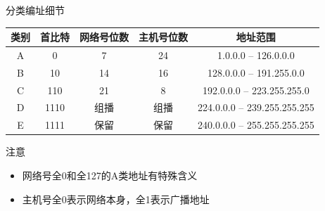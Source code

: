 \documentclass[10pt, aspectratio=169]{beamer}
\begin{document}
\begin{frame}{分类编址细节}
    \begin{table}
        \centering
        \begin{tabular}{|c|c|c|c|c|}
            \hline
            \textbf{类别} & \textbf{首比特} & \textbf{网络号位数} & \textbf{主机号位数} & \textbf{地址范围} \\
            \hline
            A & 0 & 7 & 24 & 1.0.0.0 -- 126.0.0.0 \\
            B & 10 & 14 & 16 & 128.0.0.0 -- 191.255.0.0 \\
            C & 110 & 21 & 8 & 192.0.0.0 -- 223.255.255.0 \\
            D & 1110 & 组播 & 组播 & 224.0.0.0 -- 239.255.255.255 \\
            E & 1111 & 保留 & 保留 & 240.0.0.0 -- 255.255.255.255 \\
            \hline
        \end{tabular}
    \end{table}
    \vspace{0.5em}
    \begin{alertblock}{注意}
        \begin{itemize}
            \item 网络号全0和全127的A类地址有特殊含义
            \item 主机号全0表示网络本身，全1表示广播地址
        \end{itemize}
    \end{alertblock}
\end{frame}
\end{document}
